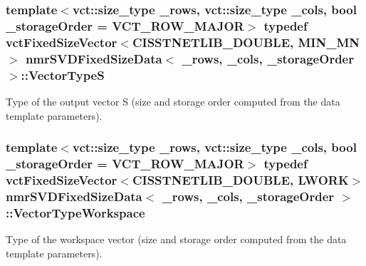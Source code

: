 \hypertarget{classnmr_s_v_d_fixed_size_data_ad9ec4977d4726118af8c7bce3d18b752}{
\subsubsection[{Vector\-Type\-S}]{\setlength{\rightskip}{0pt plus 5cm}template$<$vct\-::size\-\_\-type \-\_\-rows, vct\-::size\-\_\-type \-\_\-cols, bool \-\_\-storage\-Order = V\-C\-T\-\_\-\-R\-O\-W\-\_\-\-M\-A\-J\-O\-R$>$ typedef {\bf vct\-Fixed\-Size\-Vector}$<$C\-I\-S\-S\-T\-N\-E\-T\-L\-I\-B\-\_\-\-D\-O\-U\-B\-L\-E, {\bf M\-I\-N\-\_\-\-M\-N}$>$ {\bf nmr\-S\-V\-D\-Fixed\-Size\-Data}$<$ \-\_\-rows, \-\_\-cols, \-\_\-storage\-Order $>$\-::{\bf Vector\-Type\-S}}}\label{classnmr_s_v_d_fixed_size_data_ad9ec4977d4726118af8c7bce3d18b752}
Type of the output vector S (size and storage order computed from the data template parameters). \hypertarget{classnmr_s_v_d_fixed_size_data_a82162baa88dba7eb39bb52b71435aaa9}{
\subsubsection[{Vector\-Type\-Workspace}]{\setlength{\rightskip}{0pt plus 5cm}template$<$vct\-::size\-\_\-type \-\_\-rows, vct\-::size\-\_\-type \-\_\-cols, bool \-\_\-storage\-Order = V\-C\-T\-\_\-\-R\-O\-W\-\_\-\-M\-A\-J\-O\-R$>$ typedef {\bf vct\-Fixed\-Size\-Vector}$<$C\-I\-S\-S\-T\-N\-E\-T\-L\-I\-B\-\_\-\-D\-O\-U\-B\-L\-E, {\bf L\-W\-O\-R\-K}$>$ {\bf nmr\-S\-V\-D\-Fixed\-Size\-Data}$<$ \-\_\-rows, \-\_\-cols, \-\_\-storage\-Order $>$\-::{\bf Vector\-Type\-Workspace}}}\label{classnmr_s_v_d_fixed_size_data_a82162baa88dba7eb39bb52b71435aaa9}
Type of the workspace vector (size and storage order computed from the data template parameters). 

